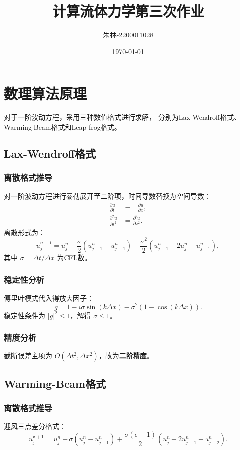 \documentclass[UTF8]{ctexart}
\begin{document}
\title{计算流体力学第三次作业}
\author{朱林-2200011028}
\date{\today}
\maketitle

\section{数理算法原理}
对于一阶波动方程，采用三种数值格式进行求解，
分别为Lax-Wendroff格式、Warming-Beam格式和Leap-frog格式。
\subsection{Lax-Wendroff格式}
\subsubsection{离散格式推导}
对一阶波动方程进行泰勒展开至二阶项，时间导数替换为空间导数：
\begin{align}
\frac{\partial u}{\partial t} &= -\frac{\partial u}{\partial x}, \\
\frac{\partial^2 u}{\partial t^2} &= \frac{\partial^2 u}{\partial x^2}.
\end{align}
离散形式为：
\begin{equation}
u_j^{n+1} = u_j^n - \frac{\sigma}{2}(u_{j+1}^n - u_{j-1}^n) + \frac{\sigma^2}{2}(u_{j+1}^n - 2u_j^n + u_{j-1}^n),
\end{equation}
其中 $\sigma = \Delta t / \Delta x$ 为CFL数。

\subsubsection{稳定性分析}
傅里叶模式代入得放大因子：
\begin{equation}
g = 1 - i\sigma \sin(k\Delta x) - \sigma^2(1 - \cos(k\Delta x)).
\end{equation}
稳定性条件为 $|g|^2 \leq 1$，解得 $\sigma \leq 1$。

\subsubsection{精度分析}
截断误差主项为 $O(\Delta t^2, \Delta x^2)$，故为\textbf{二阶精度}。

\subsection{Warming-Beam格式}
\subsubsection{离散格式推导}
迎风三点差分格式：
\begin{equation}
u_j^{n+1} = u_j^n - \sigma(u_j^n - u_{j-1}^n) + \frac{\sigma(\sigma-1)}{2}(u_j^n - 2u_{j-1}^n + u_{j-2}^n).
\end{equation}
\end{document}
